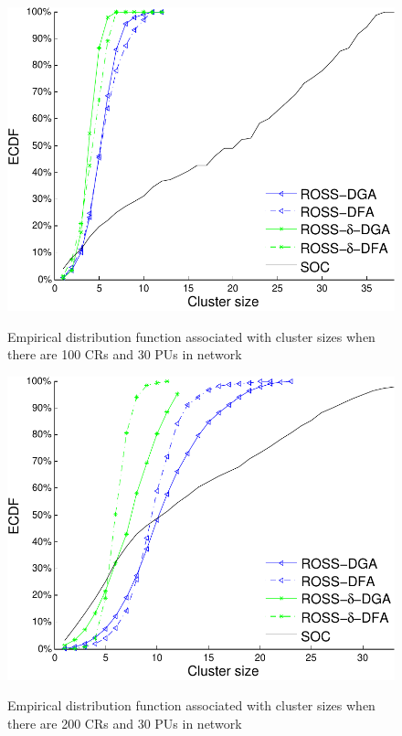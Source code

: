 \documentclass[times]{ettauth}
\theoremstyle{mytheoremstyle}
\theoremstyle{mytheoremstyle}
\theoremstyle{mytheoremstyle}
\begin{document}
\begin{figure}[t]
\begin{multicols}{3}
    \includegraphics[width=\linewidth]{cdf_clusterSize_100.pdf}\par\caption{Empirical distribution function associated with cluster sizes when there are 100 CRs and 30 PUs in network}\label{cdf_clusterSize_100}
    \includegraphics[width=\linewidth]{cdf_clusterSize_200.pdf}\par\caption{Empirical distribution function associated with cluster sizes when there are 200 CRs and 30 PUs in network}\label{cdf_clusterSize_200}

\end{multicols}
\end{figure}
\end{document}
